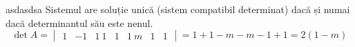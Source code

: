 
asdasdsa
Sistemul are soluție unică (sistem compatibil determinat) dacă și numai dacă determinantul său este nenul. $$ \det A = \begin{vmatrix} 1 & -1 & 1 \ 1 & 1 & 1 \ m & 1 & 1 \end{vmatrix} = 1 + 1 - m - m - 1 + 1 = 2(1 - m) $$ 
